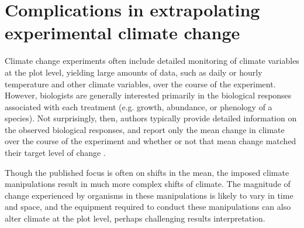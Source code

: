 \documentclass{article}
\begin{document}
\section* {Complications in extrapolating experimental climate change}
Climate change experiments often include detailed monitoring of climate variables at the plot level, yielding large amounts of data, such as daily or hourly temperature and other climate variables, over the course of the experiment. However, biologists are generally interested primarily in the biological responses associated with each treatment (e.g. growth, abundance, or phenology of a species). Not surprisingly, then, authors typically provide detailed information on the observed biological responses, and report only the mean change in climate over the course of the experiment and whether or not that mean change matched their target level of change \citep{price1998,clark2014a,clark2014b,rollinson2012}. 
\par Though the published focus is often on shifts in the mean, the imposed climate manipulations result in much more complex shifts of climate. The magnitude of change experienced by organisms in these manipulations is likely to vary in time and space, and the equipment required to conduct these manipulations can also alter climate at the plot level, perhaps challenging results interpretation. %
\end{document}
